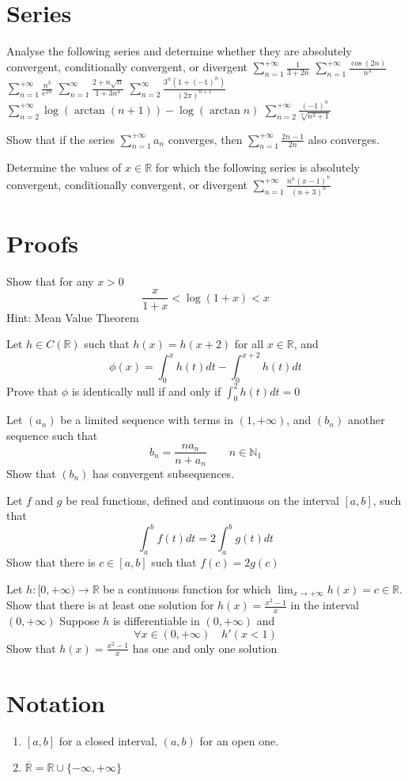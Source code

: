 \documentclass[12pt]{article}
\begin{document}
\section{Series}
\begin{ExerciseList}
	\Exercise Analyse the following series and determine whether they are absolutely convergent, conditionally convergent, or divergent
	\Question $\sum_{n=1}^{+\infty}\frac{1}{3+2n}$
	\Question $\sum_{n=1}^{+\infty}\frac{\cos(2n)}{n^3}$
	\Question $\sum_{n=1}^{+\infty}\frac{n^3}{e^{2n}}$
	\Question $\sum_{n=1}^{\infty}\frac{2+n\sqrt{n}}{1+3n^4}$
	\Question $\sum_{n=2}^{\infty}\frac{3^n(1+(-1)^n)}{(2\pi)^{n+1}}$
	\Question $\sum_{n=2}^{+\infty} \log(\arctan(n+1))-\log(\arctan n)$
	\Question $\sum_{n=2}^{+\infty} \frac{(-1)^n}{\sqrt[4]{n^3 + 1}}$

	\Exercise Show that if the series $\sum_{n=1}^{+\infty}a_n$ converges, then
	$\sum_{n=1}^{+\infty}\frac{2n-1}{2n}$ also converges.

	\Exercise Determine the values of $x\in\mathbb R$ for which the following series
	is absolutely convergent, conditionally convergent, or divergent
	\Question $\sum_{n=1}^{+\infty}\frac{n^n(x-1)^n}{(n+3)^n}$
\end{ExerciseList}

\section{Proofs}
\begin{ExerciseList}
	\Exercise Show that for any $x>0$
	$$\frac{x}{1+x} < \log(1+x) < x$$
	Hint: Mean Value Theorem

	\Exercise Let $h\in C(\mathbb R)$ such that $h(x) = h(x+2)$ for all $x\in\mathbb R$, and
	$$\phi(x) = \int_0^x{h(t)dt}-\int_0^{x+2}{h(t)dt}$$
	Prove that $\phi$ is identically null if and only if $\int_0^2 h(t)dt = 0$

	\Exercise Let $(a_n)$ be a limited sequence with terms in $(1,+\infty)$, and
	$(b_n)$ another sequence such that $$b_n = \frac{na_n}{n+a_n}\qquad n\in\mathbb N_1$$
	Show that $(b_n)$ has convergent subsequences.

	\Exercise Let $f$ and $g$ be real functions, defined and continuous on the interval $[a,b]$, such that
	$$\int_a^b{f(t)}dt = 2\int_a^b{g(t)}dt$$
	Show that there is $c\in[a,b]$ such that $f(c)=2g(c)$

	\Exercise Let $h\colon [0,+\infty)\to\mathbb R$ be a continuous function
	for which $\lim_{x\to +\infty}h(x)=c\in\mathbb R$.
	\Question Show that there is at least one solution for $h(x)=\frac{x^2-1}{x}$
	in the interval $(0,+\infty)$
	\Question Suppose $h$ is differentiable in $(0,+\infty)$ and
	$$\forall x\in(0,+\infty)\quad h'(x<1)$$
	Show that $h(x)=\frac{x^2-1}{x}$ has one and only one solution

	\Exercise

\end{ExerciseList}
\section{Notation}
\begin{enumerate}
	\item  $[a,b]$ for a closed interval, $(a,b)$ for an open one.
	\item $\overline{\mathbb R} = \mathbb R \cup \{-\infty, +\infty\}$
\end{enumerate}
\end{document}
